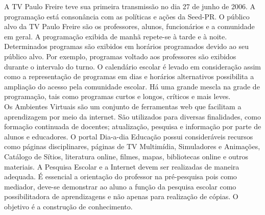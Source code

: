 \documentclass[a4paper, 12pt]{article}
\begin{document}
\begin{enumerate}
\begin{enumerate}
      A TV Paulo Freire teve sua primeira transmissão no dia 27 de junho de 2006. A programação está consonância com as políticas e ações da Seed-PR. O público alvo da TV Paulo Freire são os professores, alunos, funcionários e a comunidade em geral. A programação exibida de manhã repete-se à tarde e à noite. Determinados programas são exibidos em horários programados devido ao seu público alvo. Por exemplo, programas voltado aos professores são exibidos durante o intervalo do turno. O calendário escolar é levado em consideração assim como a representação de programas em dias e horários alternativos possibilita a ampliação do acesso pela comunidade escolar. Há uma grande mescla na grade de programação, tais como programas curtos e longos, críticos e mais leves. \\
      Os Ambientes Virtuais são um conjunto de ferramentas web que facilitam a aprendizagem por meio da internet. São utilizados para diversas finalidades, como formação continuada de docentes; atualização, pesquisa e informação por parte de alunos e educadores. O portal Dia-a-dia Educação possui consideráveis recursos como páginas disciplinares, páginas de TV Multimídia, Simuladores e Animações, Catálogo de Sítios, literatura online, filmes, mapas, bibliotecas online e outros materiais.
      A Pesquisa Escolar e a Internet devem ser realizadas de maneira adequada. É essencial a orientação do professor na pré-pesquisa pois como mediador, deve-se demonstrar ao aluno a função da pesquisa escolar como possibilitadora de aprendizagens e não apenas para realização de cópias. O objetivo é a construção de conhecimento.
      

\end{enumerate}
\end{enumerate}
\end{document}

